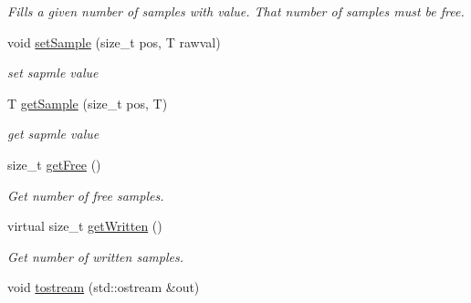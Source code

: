 \begin{DoxyCompactItemize}
\begin{DoxyCompactList}\small\item\em Fills a given number of samples with value. That number of samples must be free. \item\end{DoxyCompactList}\item 
\hypertarget{classgdf_1_1_channel_data_a5f7d5b6e536b749b5d6e6d0ec845d43d}{
void \hyperlink{classgdf_1_1_channel_data_a5f7d5b6e536b749b5d6e6d0ec845d43d}{setSample} (size\_\-t pos, T rawval)}
\label{classgdf_1_1_channel_data_a5f7d5b6e536b749b5d6e6d0ec845d43d}

\begin{DoxyCompactList}\small\item\em set sapmle value \item\end{DoxyCompactList}\item 
\hypertarget{classgdf_1_1_channel_data_a92c2adf653075fc97b7230981c1dd62f}{
T \hyperlink{classgdf_1_1_channel_data_a92c2adf653075fc97b7230981c1dd62f}{getSample} (size\_\-t pos, T)}
\label{classgdf_1_1_channel_data_a92c2adf653075fc97b7230981c1dd62f}

\begin{DoxyCompactList}\small\item\em get sapmle value \item\end{DoxyCompactList}\item 
\hypertarget{classgdf_1_1_channel_data_a2d1e7afb4eb90587dfe6a8b309fae185}{
size\_\-t \hyperlink{classgdf_1_1_channel_data_a2d1e7afb4eb90587dfe6a8b309fae185}{getFree} ()}
\label{classgdf_1_1_channel_data_a2d1e7afb4eb90587dfe6a8b309fae185}

\begin{DoxyCompactList}\small\item\em Get number of free samples. \item\end{DoxyCompactList}\item 
\hypertarget{classgdf_1_1_channel_data_a140a1309e5b054b104ea2f18bd42b01a}{
virtual size\_\-t \hyperlink{classgdf_1_1_channel_data_a140a1309e5b054b104ea2f18bd42b01a}{getWritten} ()}
\label{classgdf_1_1_channel_data_a140a1309e5b054b104ea2f18bd42b01a}

\begin{DoxyCompactList}\small\item\em Get number of written samples. \item\end{DoxyCompactList}\item 
\hypertarget{classgdf_1_1_channel_data_a873a796235e69086ae360998d24e159d}{
void \hyperlink{classgdf_1_1_channel_data_a873a796235e69086ae360998d24e159d}{tostream} (std::ostream \&out)}
\label{classgdf_1_1_channel_data_a873a796235e69086ae360998d24e159d}


\end{DoxyCompactItemize}
